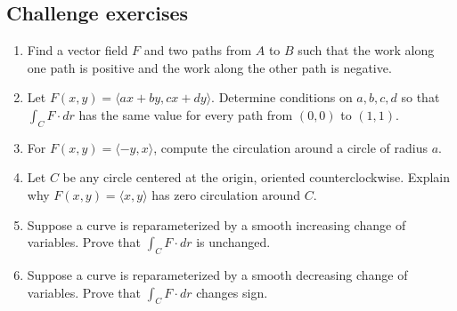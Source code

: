 \documentclass[11pt,oneside]{book}
\begin{document}
\subsection*{Challenge exercises}
\begin{enumerate}[start=21]
  \item Find a vector field $F$ and two paths from $A$ to $B$ such that the work along one path is positive and the work along the other path is negative.
  \item Let $F(x,y)=\langle ax+by,cx+dy\rangle$. Determine conditions on $a,b,c,d$ so that $\int_C F\cdot dr$ has the same value for every path from $(0,0)$ to $(1,1)$.
  \item For $F(x,y)=\langle -y,x\rangle$, compute the circulation around a circle of radius $a$.
  \item Let $C$ be any circle centered at the origin, oriented counterclockwise. Explain why $F(x,y)=\langle x,y\rangle$ has zero circulation around $C$.
  \item Suppose a curve is reparameterized by a smooth increasing change of variables. Prove that $\int_C F\cdot dr$ is unchanged.
  \item Suppose a curve is reparameterized by a smooth decreasing change of variables. Prove that $\int_C F\cdot dr$ changes sign.
\end{enumerate}
\end{document}
